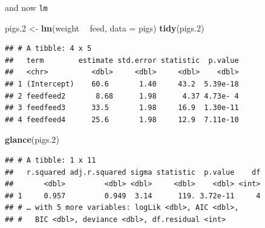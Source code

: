 \documentclass[ignorenonframetext,]{beamer}
\newenvironment{Shaded}{\begin{snugshade}}{\end{snugshade}}
\newcommand{\DataTypeTok}[1]{\textcolor[rgb]{0.13,0.29,0.53}{#1}}
\newcommand{\FloatTok}[1]{\textcolor[rgb]{0.00,0.00,0.81}{#1}}
\newcommand{\KeywordTok}[1]{\textcolor[rgb]{0.13,0.29,0.53}{\textbf{#1}}}
\newcommand{\NormalTok}[1]{#1}
\newcommand{\OperatorTok}[1]{\textcolor[rgb]{0.81,0.36,0.00}{\textbf{#1}}}
\newcommand{\StringTok}[1]{\textcolor[rgb]{0.31,0.60,0.02}{#1}}
\begin{document}
\begin{frame}[fragile]{and now \texttt{lm}}
\protect\hypertarget{and-now-lm}{}

\footnotesize

\begin{Shaded}
\begin{Highlighting}[]
\NormalTok{pigs}\FloatTok{.2}\NormalTok{ <-}\StringTok{ }\KeywordTok{lm}\NormalTok{(weight }\OperatorTok{~}\StringTok{ }\NormalTok{feed, }\DataTypeTok{data =}\NormalTok{ pigs)}
\KeywordTok{tidy}\NormalTok{(pigs}\FloatTok{.2}\NormalTok{)}
\end{Highlighting}
\end{Shaded}

\begin{verbatim}
## # A tibble: 4 x 5
##   term        estimate std.error statistic  p.value
##   <chr>          <dbl>     <dbl>     <dbl>    <dbl>
## 1 (Intercept)    60.6       1.40     43.2  5.39e-18
## 2 feedfeed2       8.68      1.98      4.37 4.73e- 4
## 3 feedfeed3      33.5       1.98     16.9  1.30e-11
## 4 feedfeed4      25.6       1.98     12.9  7.11e-10
\end{verbatim}

\begin{Shaded}
\begin{Highlighting}[]
\KeywordTok{glance}\NormalTok{(pigs}\FloatTok{.2}\NormalTok{)}
\end{Highlighting}
\end{Shaded}

\begin{verbatim}
## # A tibble: 1 x 11
##   r.squared adj.r.squared sigma statistic  p.value    df
##       <dbl>         <dbl> <dbl>     <dbl>    <dbl> <int>
## 1     0.957         0.949  3.14      119. 3.72e-11     4
## # … with 5 more variables: logLik <dbl>, AIC <dbl>,
## #   BIC <dbl>, deviance <dbl>, df.residual <int>
\end{verbatim}

\normalsize

\end{frame}
\end{document}
